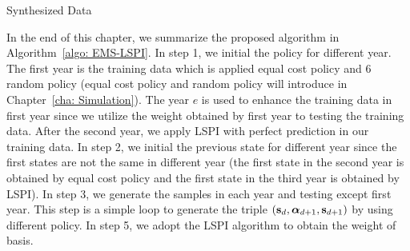 \begin{algorithm}[!t]
    \label{algo: synthesized data}
    \caption{Synthesized Data}
\end{algorithm}

In the end of this chapter, we summarize the proposed algorithm in Algorithm~\ref{algo: EMS-LSPI}. In step 1, we initial the policy for different year. The first year is the training data which is applied equal cost policy and 6 random policy (equal cost policy and random policy will introduce in Chapter~\ref{cha: Simulation}). The year $e$ is used to enhance the training data in first year since we utilize the weight obtained by first year to testing the training data. After the second year, we apply LSPI with perfect prediction in our training data. In step 2, we initial the previous state for different year since the first states are not the same in different year (the first state in the second year is obtained by equal cost policy and the first state in the third year is obtained by LSPI). In step 3, we generate the samples in each year and testing except first year. This step is a simple loop to generate the triple $({\mathbf s}_d,\boldsymbol{\alpha}_{d+1},{\mathbf s}_{d+1})$ by using different policy. In step 5, we adopt the LSPI algorithm to obtain the weight of basis.

